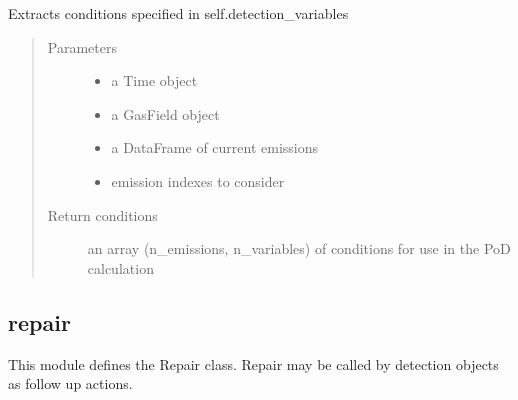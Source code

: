 \documentclass[letterpaper,10pt,english]{sphinxmanual}
\begin{document}
\begin{fulllineitems}
\begin{fulllineitems}
\end{fulllineitems}


\begin{fulllineitems}
\label{\detokenize{index:feast.DetectionModules.abstract_detection_method.DetectionMethod.get_current_conditions}}
Extracts conditions specified in self.detection\_variables
\begin{quote}\begin{description}
\item[{Parameters}] \leavevmode\begin{itemize}
\item {} 
 \textendash{} a Time object

\item {} 
 \textendash{} a GasField object

\item {} 
 \textendash{} a DataFrame of current emissions

\item {} 
 \textendash{} emission indexes to consider

\end{itemize}

\item[{Return conditions}] \leavevmode
an array (n\_emissions, n\_variables) of conditions for use in the PoD calculation

\end{description}\end{quote}

\end{fulllineitems}


\end{fulllineitems}



\subsection{repair}
\label{\detokenize{index:module-feast.DetectionModules.repair}}\label{\detokenize{index:repair}}
This module defines the Repair class. Repair may be called by detection objects as follow up actions.
\end{document}
